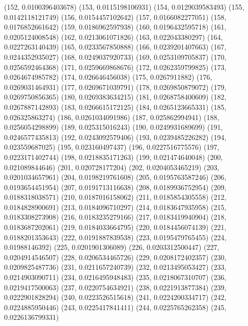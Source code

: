 {					(152, 0.0100396403678)
					(153, 0.0115198106931)
					(154, 0.0129039583493)
					(155, 0.0142118121749)
					(156, 0.0154457102642)
					(157, 0.0166082277051)
					(158, 0.0176852661642)
					(159, 0.0186962597938)
					(160, 0.0196432595718)
					(161, 0.0205124008548)
					(162, 0.0213061071826)
					(163, 0.022043380297)
					(164, 0.0227263140439)
					(165, 0.0233567850888)
					(166, 0.0239201407663)
					(167, 0.0244352935027)
					(168, 0.0249037920733)
					(169, 0.0253109705837)
					(170, 0.0256592464368)
					(171, 0.0259669868676)
					(172, 0.0262359799825)
					(173, 0.0264674985782)
					(174, 0.026646456038)
					(175, 0.0267911882)
					(176, 0.0269031464931)
					(177, 0.0269671039791)
					(178, 0.0269850879072)
					(179, 0.0269750856365)
					(180, 0.0269383634215)
					(181, 0.0268758400609)
					(182, 0.0267887142893)
					(183, 0.0266615172125)
					(184, 0.0265123665331)
					(185, 0.026325863274)
					(186, 0.0261034091986)
					(187, 0.025862994941)
					(188, 0.0256054298899)
					(189, 0.025315016243)
					(190, 0.0249931689699)
					(191, 0.0246577435813)
					(192, 0.0243092579406)
					(193, 0.0239485226282)
					(194, 0.023559687025)
					(195, 0.023160497437)
					(196, 0.0227516775576)
					(197, 0.0223171402744)
					(198, 0.0218835171263)
					(199, 0.021474640048)
					(200, 0.021089844646)
					(201, 0.020728177204)
					(202, 0.0204053465219)
					(203, 0.0201034657961)
					(204, 0.0198219761608)
					(205, 0.0195763587246)
					(206, 0.0193654451954)
					(207, 0.0191713116638)
					(208, 0.0189936752954)
					(209, 0.0188318038571)
					(210, 0.0187016158062)
					(211, 0.0185854305558)
					(212, 0.0184828900691)
					(213, 0.0184096710297)
					(214, 0.0183647935958)
					(215, 0.0183308273908)
					(216, 0.0183235279166)
					(217, 0.0183419940904)
					(218, 0.0183687202061)
					(219, 0.0184033664795)
					(220, 0.0184456074139)
					(221, 0.0188201353643)
					(222, 0.0191887839538)
					(223, 0.0195479765455)
					(224, 0.01988146392)
					(225, 0.0201901306089)
					(226, 0.0203312500447)
					(227, 0.0204914546507)
					(228, 0.0206534465726)
					(229, 0.0208172402357)
					(230, 0.0209825487736)
					(231, 0.0211657240739)
					(232, 0.0213495053427)
					(233, 0.0214903090711)
					(234, 0.0216495948483)
					(235, 0.0218067310707)
					(236, 0.0219417500063)
					(237, 0.0220754634921)
					(238, 0.0221913877384)
					(239, 0.0222901828294)
					(240, 0.0223526515618)
					(241, 0.0224200334717)
					(242, 0.0224885950446)
					(243, 0.0225417841411)
					(244, 0.0225765262358)
					(245, 0.0226136799331)
}
